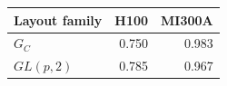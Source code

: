 \begin{tabular}{@{}lrr@{}}
\toprule
Layout family & H100 & MI300A \\
\midrule
$G_C$ & 0.750 & 0.983 \\
$GL(p,2)$ & 0.785 & 0.967 \\
\bottomrule
\end{tabular}
